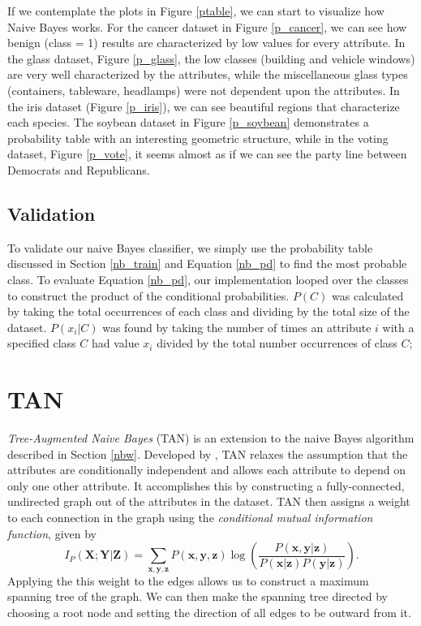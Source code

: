\documentclass{article}
\newcommand{\ve}[1]{\boldsymbol{\mathbf{#1}}}
\begin{document}
		If we contemplate the plots in Figure \ref{ptable}, we can start to visualize how Naive Bayes works. 
		For the cancer dataset in Figure \ref{p_cancer}, we can see how benign (class = 1) results are characterized by low values for every attribute. 
		In the glass dataset, Figure \ref{p_glass}, the low classes (building and vehicle windows) are very well characterized by the attributes, while the miscellaneous glass types (containers, tableware, headlamps) were not dependent upon the attributes. 
		In the iris dataset (Figure \ref{p_iris}), we can see beautiful regions that characterize each species. 
		The soybean dataset in Figure \ref{p_soybean} demonstrates a probability table with an interesting geometric structure, while in the voting dataset, Figure \ref{p_vote}, it seems almost as if we can see the party line between Democrats and Republicans.
				
	\subsection{Validation}
		\label{nbv}
		
		To validate our naive Bayes classifier, we simply use the probability table discussed in Section \ref{nb_train} and Equation \ref{nb_pd} to find the most probable class. 
		To evaluate Equation \ref{nb_pd}, our implementation looped over the classes to construct the product of the conditional probabilities. $P(C)$ was calculated by taking the total occurrences of each class and dividing by the total size of the dataset. $P(x_i | C)$ was found by taking the number of times an attribute $i$ with a specified class $C$ had value $x_i$  divided by the total number occurrences of class $C$;
		
\section{TAN}

		\textit{Tree-Augmented Naive Bayes} (TAN) is an extension to the naive Bayes algorithm described in Section \ref{nbw}. 
		Developed by \cite{Friedman1997}, TAN relaxes the assumption that the attributes are conditionally independent and allows each attribute to depend on only one other attribute. 
		It accomplishes this by constructing a fully-connected, undirected graph out of the attributes in the dataset. 
		TAN then assigns a weight to each connection in the graph using the \textit{conditional mutual information function}, given by	
		\begin{equation*}
			I_P(\ve{X};\ve{Y} | \ve{Z}) = \sum_{\ve{x},\ve{y},\ve{z}} P(\ve{x},\ve{y}, \ve{z}) \log \left( \frac{P(\ve{x},\ve{y} | \ve{z})}{P(\ve{x}|\ve{z})P(\ve{y}|\ve{z})} \right).
			\label{cmi}
		\end{equation*}		
		Applying the this weight to the edges allows us to construct a maximum spanning tree of the graph. 
		We can then make the spanning tree directed by choosing a root node and setting the direction of all edges to be outward from it.
		
\end{document}
